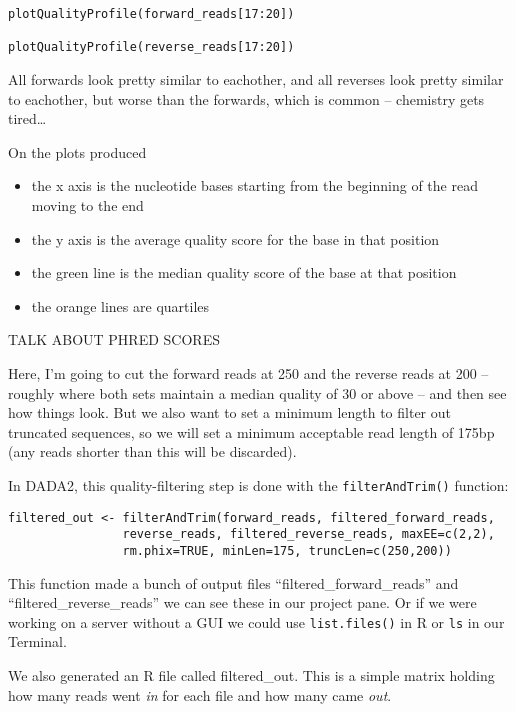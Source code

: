 \documentclass[
]{book}
\begin{document}
\begin{verbatim}
plotQualityProfile(forward_reads[17:20])

plotQualityProfile(reverse_reads[17:20])
\end{verbatim}

All forwards look pretty similar to eachother, and all reverses look pretty similar to eachother, but worse than the forwards, which is common -- chemistry gets tired\ldots{}

On the plots produced

\begin{itemize}
\item
  the x axis is the nucleotide bases starting from the beginning of the read moving to the end
\item
  the y axis is the average quality score for the base in that position
\item
  the green line is the median quality score of the base at that position
\item
  the orange lines are quartiles
\end{itemize}

TALK ABOUT PHRED SCORES

Here, I'm going to cut the forward reads at 250 and the reverse reads at 200 -- roughly where both sets maintain a median quality of 30 or above -- and then see how things look. But we also want to set a minimum length to filter out truncated sequences, so we will set a minimum acceptable read length of 175bp (any reads shorter than this will be discarded).

In DADA2, this quality-filtering step is done with the \texttt{filterAndTrim()} function:

\begin{verbatim}
filtered_out <- filterAndTrim(forward_reads, filtered_forward_reads,
                reverse_reads, filtered_reverse_reads, maxEE=c(2,2),
                rm.phix=TRUE, minLen=175, truncLen=c(250,200))
\end{verbatim}

This function made a bunch of output files ``filtered\_forward\_reads'' and ``filtered\_reverse\_reads'' we can see these in our project pane. Or if we were working on a server without a GUI we could use \texttt{list.files()} in R or \texttt{ls} in our Terminal.

We also generated an R file called filtered\_out. This is a simple matrix holding how many reads went \emph{in} for each file and how many came \emph{out}.
\end{document}
